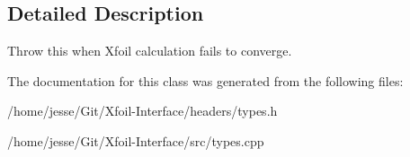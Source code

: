 \subsection{Detailed Description}
Throw this when Xfoil calculation fails to converge. 

The documentation for this class was generated from the following files\+:\begin{DoxyCompactItemize}
\item 
/home/jesse/\+Git/\+Xfoil-\/\+Interface/headers/types.\+h\item 
/home/jesse/\+Git/\+Xfoil-\/\+Interface/src/types.\+cpp\end{DoxyCompactItemize}
